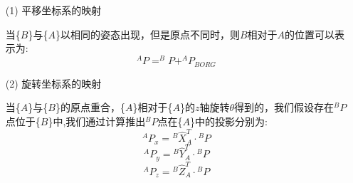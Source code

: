 \documentclass{seuthesis-2022}
\numberwithin{equation}{section}
\begin{document}
\begin{itemize}
  \item [(1)]
  平移坐标系的映射

  当\{$B$\}与\{$A$\}以相同的姿态出现，但是原点不同时，则$B$相对于$A$的位置可以表示为:
  \begin{equation}
  ^{A}P=^{B}P+^{A}P_{BORG}
  \end{equation}
  
  \item [(2)]旋转坐标系的映射
  
  当\{$A$\}与\{$B$\}的原点重合，\{$A$\}相对于\{$A$\}的$z$轴旋转$\theta$得到的，我们假设存在$^{B}P$点位于\{$B$\}中,我们通过计算推出$^{B}P$点在\{$A$\}中的投影分别为:
  \begin{equation}
    ^{A}P_x = {^{B}\hat{X}^{T}_{A}} \cdot {^{B}P}
  \end{equation}
  \begin{equation}
    ^{A}P_y = {^{B}\hat{Y}^{T}_{A}} \cdot {^{B}P}
  \end{equation}
  \begin{equation}
    ^{A}P_z = {^{B}\hat{Z}^{T}_{A}} \cdot {^{B}P}
  \end{equation}


\end{itemize}
\end{document}

